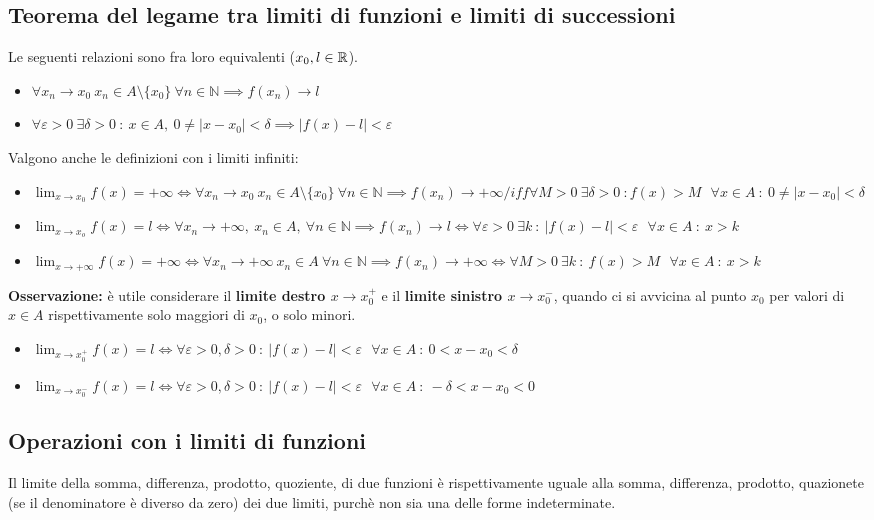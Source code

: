 \documentclass[../../main.tex]{subfiles}
\begin{document}
\subsection{Teorema del legame tra limiti di funzioni e limiti di successioni}
Le seguenti relazioni sono fra loro equivalenti ($x_0, l\in\mathbb{R}$).
\begin{itemize}
    \item $\forall x_n \to x_0 \ x_n \in A \setminus \{x_0\} \ \forall n\in \mathbb{N} \implies f(x_n) \to l$
    \item $\forall\varepsilon>0 \ \exists\delta>0 \ : \ x\in A, \ 0\neq |x-x_0|<\delta \implies |f(x)-l|<\varepsilon$
\end{itemize}
Valgono anche le definizioni con i limiti infiniti:
\begin{itemize}
    \item $\lim_{x\to x_0} f(x) = +\infty \iff \forall x_n \to x_0 \ x_n \in A \setminus \{x_0\} \ \forall n \in \mathbb{N} \implies f(x_n) \to +\infty /iff \forall M > 0 \ \exists \delta > 0 \ : f(x) > M \ \ \ \forall x \in A \ : \ 0 \neq |x - x_0| < \delta$
    \item $\lim_{x\to x_o} f(x) = l \iff \forall x_n\to+\infty, \ x_n\in A, \ \forall n \in \mathbb{N} \implies f(x_n) \to l \iff \forall \varepsilon > 0 \ \exists k \ : \ |f(x) - l| < \varepsilon \ \ \ \forall x \in A \ : \ x > k$
    \item $\lim_{x\to+\infty} f(x) = +\infty \iff \forall x_n \to +\infty \ x_n \in A \ \forall n \in \mathbb{N} \implies f(x_n) \to +\infty \iff \forall M > 0 \ \exists k \ : \ f(x) > M \ \ \ \forall x \in A \ : \ x > k$
\end{itemize}
\textbf{Osservazione:} è utile considerare il \textbf{limite destro $x\to x_0^+$} e il \textbf{limite sinistro $x\to x_0^-$}, quando ci si avvicina al punto $x_0$ per valori di $x\in A$ rispettivamente solo maggiori di $x_0$, o solo minori.
\begin{itemize}
    \item $\lim_{x\to x_0^+} f(x) = l \iff \forall\varepsilon > 0,\delta > 0 \ : \ |f(x)-l|<\varepsilon \ \ \ \forall x \in A \ : \ 0 < x - x_0 < \delta$
    \item $\lim_{x\to x_0^-} f(x) = l \iff \forall\varepsilon > 0,\delta > 0 \ : \ |f(x)-l|<\varepsilon \ \ \ \forall x \in A \ : \ -\delta < x - x_0 < 0$
\end{itemize}

\subsection{Operazioni con i limiti di funzioni}
Il limite della somma, differenza, prodotto, quoziente, di due funzioni è
rispettivamente uguale alla somma, differenza, prodotto, quazionete (se il
denominatore è diverso da zero) dei due limiti, purchè non sia una delle forme
indeterminate.
\end{document}

